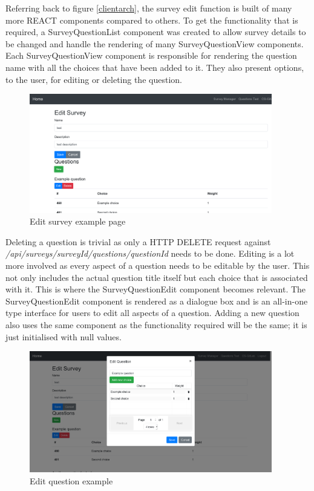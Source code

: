 Referring back to figure \ref{clientarch}, the survey edit function is built of many more REACT components compared to others.
To get the functionality that is required, a SurveyQuestionList component was created to allow survey details to be changed 
and handle the rendering of many SurveyQuestionView components.
Each SurveyQuestionView component is responsible for rendering the question name with all the choices that have been added to it.
They also present options, to the user, for editing or deleting the question.

\begin{figure}[ht]
    \centering
    \includegraphics[width=400px]{images/edit_survey_screen.png}
    \caption{Edit survey example page}
    \label{editsurveyexample}
\end{figure}

Deleting a question is trivial as only a HTTP DELETE request against \textit{/api/surveys/{surveyId}/questions/{questionId}} needs to be done.
Editing is a lot more involved as every aspect of a question needs to be editable by the user.
This not only includes the actual question title itself but each choice that is associated with it.
This is where the SurveyQuestionEdit component becomes relevant.
The SurveyQuestionEdit component is rendered as a dialogue box and is an all-in-one type interface for users to edit all aspects of a question. 
Adding a new question also uses the same component as the functionality required will be the same; it is just initialised
with null values.

\begin{figure}[ht]
    \centering
    \includegraphics[width=400px]{images/edit_question_screen.png}
    \caption{Edit question example}
    \label{editquestionexample}
\end{figure}

